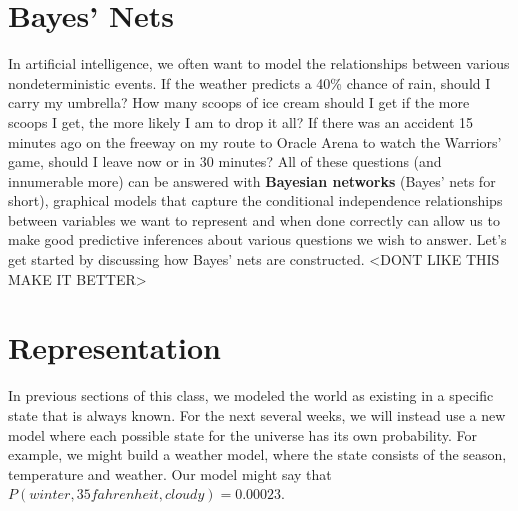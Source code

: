 \documentclass[11pt,fleqn]{article}
\def\title{Note \the\lecturenumber}
\begin{document}
\maketitle


\iffalse
\documentclass[11pt,fleqn]{article}
\usepackage{latexsym,epsf,amsmath,amsfonts,graphicx,url}

\title{Note 6}

\newcommand{\F}{\mathbb{F}}
\newcommand{\Z}{\mathbb{Z}}
\newcommand{\Q}{\mathbb{Q}}
\newcommand{\R}{\mathbb{R}}
\newcommand{\C}{\mathbb{C}}

\begin{document}

\maketitle
\fi

\section*{Bayes' Nets}
In artificial intelligence, we often want to model the relationships between various nondeterministic events. If the weather predicts a 40\% chance of rain, should I carry my umbrella? How many scoops of ice cream should I get if the more scoops I get, the more likely I am to drop it all? If there was an accident 15 minutes ago on the freeway on my route to Oracle Arena to watch the Warriors' game, should I leave now or in 30 minutes? All of these questions (and innumerable more) can be answered with \textbf{Bayesian networks} (Bayes' nets for short), graphical models that capture the conditional independence relationships between variables we want to represent and when done correctly can allow us to make good predictive inferences about various questions we wish to answer. Let's get started by discussing how Bayes' nets are constructed. <DONT LIKE THIS MAKE IT BETTER>

\section*{Representation}

In previous sections of this class, we modeled the world as existing in a specific state that is always known. For the next several weeks, we will instead use a new model where each possible state for the universe has its own probability. For example, we might build a weather model, where the state consists of the season, temperature and weather. Our model might say that $P(winter, 35 fahrenheit, cloudy) = 0.00023$.


\end{document}
\end{document}
